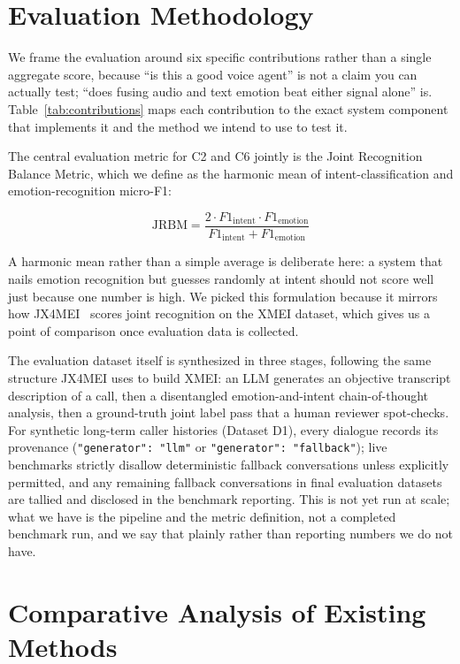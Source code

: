\documentclass[conference]{IEEEtran}
\begin{document}
\section{Evaluation Methodology}
\label{sec:evaluation}

We frame the evaluation around six specific contributions rather than a single aggregate score, because ``is this a good voice agent'' is not a claim you can actually test; ``does fusing audio and text emotion beat either signal alone'' is. Table~\ref{tab:contributions} maps each contribution to the exact system component that implements it and the method we intend to use to test it.



The central evaluation metric for C2 and C6 jointly is the Joint Recognition Balance Metric, which we define as the harmonic mean of intent-classification and emotion-recognition micro-F1:

\begin{equation}
\text{JRBM} = \frac{2 \cdot F1_{\text{intent}} \cdot F1_{\text{emotion}}}{F1_{\text{intent}} + F1_{\text{emotion}}}
\label{eq:jrbm}
\end{equation}

A harmonic mean rather than a simple average is deliberate here: a system that nails emotion recognition but guesses randomly at intent should not score well just because one number is high. We picked this formulation because it mirrors how JX4MEI~\cite{jx4mei} scores joint recognition on the XMEI dataset, which gives us a point of comparison once evaluation data is collected.

The evaluation dataset itself is synthesized in three stages, following the same structure JX4MEI uses to build XMEI: an LLM generates an objective transcript description of a call, then a disentangled emotion-and-intent chain-of-thought analysis, then a ground-truth joint label pass that a human reviewer spot-checks. For synthetic long-term caller histories (Dataset D1), every dialogue records its provenance (\texttt{"generator": "llm"} or \texttt{"generator": "fallback"}); live benchmarks strictly disallow deterministic fallback conversations unless explicitly permitted, and any remaining fallback conversations in final evaluation datasets are tallied and disclosed in the benchmark reporting. This is not yet run at scale; what we have is the pipeline and the metric definition, not a completed benchmark run, and we say that plainly rather than reporting numbers we do not have.

\section{Comparative Analysis of Existing Methods}
\label{sec:comparison}
\end{document}
